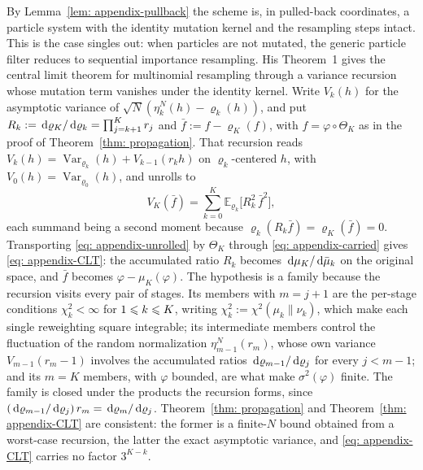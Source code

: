 \documentclass{article}
\begin{document}
By Lemma~\ref{lem: appendix-pullback} the scheme is, in pulled-back coordinates, a particle system with the identity mutation kernel and the resampling steps intact. This is the case \citet{chopin2004central} singles out: when particles are not mutated, the generic particle filter reduces to sequential importance resampling. His Theorem~1 gives the central limit theorem for multinomial resampling through a variance recursion whose mutation term vanishes under the identity kernel. Write $V_k(h)$ for the asymptotic variance of $\sqrt N(\eta_k^N(h)-\varrho_k(h))$, and put $R_k := \,\mathrm d\varrho_K/\,\mathrm d\varrho_k = \prod_{j=k+1}^{K} r_j$ and $\bar f := f - \varrho_K(f)$, with $f = \varphi\circ\Theta_K$ as in the proof of Theorem~\ref{thm: propagation}. That recursion reads $V_k(h) = \operatorname{Var}_{\varrho_k}(h) + V_{k-1}(r_k h)$ on $\varrho_k$-centered $h$, with $V_0(h) = \operatorname{Var}_{\varrho_0}(h)$, and unrolls to
\begin{equation}
    V_K(\bar f) = \sum_{k=0}^{K} \mathbb E_{\varrho_k}\bigl[R_k^{2}\,\bar f^{2}\bigr],
    \label{eq: appendix-unrolled}
\end{equation}
each summand being a second moment because $\varrho_k(R_k\bar f) = \varrho_K(\bar f) = 0$. Transporting \eqref{eq: appendix-unrolled} by $\Theta_K$ through \eqref{eq: appendix-carried} gives \eqref{eq: appendix-CLT}: the accumulated ratio $R_k$ becomes $\,\mathrm d\mu_K/\,\mathrm d\bar\mu_k$ on the original space, and $\bar f$ becomes $\varphi-\mu_K(\varphi)$. The hypothesis is a family because the recursion visits every pair of stages. Its members with $m=j+1$ are the per-stage conditions $\chi^2_k<\infty$ for $1\leqslant k\leqslant K$, writing $\chi^2_k := \chi^2(\mu_k\|\nu_k)$, which make each single reweighting square integrable; its intermediate members control the fluctuation of the random normalization $\eta_{m-1}^N(r_m)$, whose own variance $V_{m-1}(r_m-1)$ involves the accumulated ratios $\,\mathrm d\varrho_{m-1}/\,\mathrm d\varrho_j$ for every $j<m-1$; and its $m=K$ members, with $\varphi$ bounded, are what make $\sigma^2(\varphi)$ finite. The family is closed under the products the recursion forms, since $(\,\mathrm d\varrho_{m-1}/\,\mathrm d\varrho_j)\,r_m = \,\mathrm d\varrho_m/\,\mathrm d\varrho_j$. Theorem~\ref{thm: propagation} and Theorem~\ref{thm: appendix-CLT} are consistent: the former is a finite-$N$ bound obtained from a worst-case recursion, the latter the exact asymptotic variance, and \eqref{eq: appendix-CLT} carries no factor $3^{K-k}$.
\end{document}
